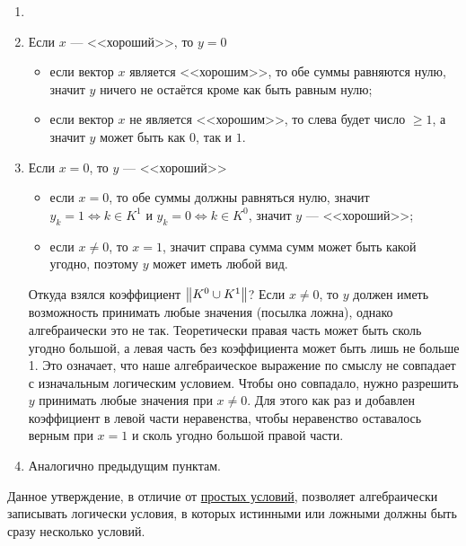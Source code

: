 \begin{enumerate}[nosep]
	\item[]
	
	\item Если $x$ --- <<хороший>>, то $y = 0$
	
	\begin{itemize}[nosep]
		\item если вектор $x$ является <<хорошим>>, то обе суммы равняются нулю, значит $y$ ничего не остаётся кроме как быть равным нулю;
		
		\item если вектор $x$ не является <<хорошим>>, то слева будет число $\ge 1$, а значит $y$ может быть как $0$, так и $1$.
	\end{itemize}
	
	\item Если $x = 0$, то $y$ --- <<хороший>>
	
	\begin{itemize}[nosep]
		\item если $x = 0$, то обе суммы должны равняться нулю, значит $y_k = 1 \Leftrightarrow k \in K^1$ и $y_k = 0 \Leftrightarrow k \in K^0$, значит $y$ --- <<хороший>>;
		
		\item если $x \neq 0$, то $x = 1$, значит справа сумма сумм может быть какой угодно, поэтому $y$ может иметь любой вид.
	\end{itemize}
	
	\begin{note}
		Откуда взялся коэффициент $\norm{K^0 \cup K^1}$? Если $x \neq 0$, то $y$ должен иметь возможность принимать любые значения (посылка ложна), однако алгебраически это не так. Теоретически правая часть может быть сколь угодно большой, а левая часть без коэффициента может быть лишь не больше 1. Это означает, что наше алгебраическое выражение по смыслу не совпадает с изначальным логическим условием. Чтобы оно совпадало, нужно разрешить $y$ принимать любые значения при $x \neq 0$. Для этого как раз и добавлен коэффициент в левой части неравенства, чтобы неравенство оставалось верным при $x = 1$ и сколь угодно большой правой части.
	\end{note}
	
	\item Аналогично предыдущим пунктам.
\end{enumerate}

\example

Данное утверждение, в отличие от \hyperref[fact:simple_conditions]{простых условий}, позволяет алгебраически записывать логически условия, в которых истинными или ложными должны быть сразу несколько условий.

